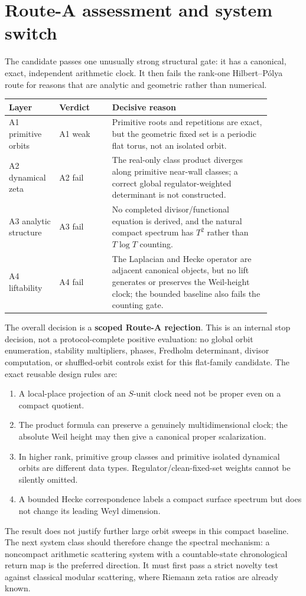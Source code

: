 \section{Route-A assessment and system switch}

The candidate passes one unusually strong structural gate: it has a
canonical, exact, independent arithmetic clock.  It then fails the rank-one
Hilbert--P\'olya route for reasons that are analytic and geometric rather
than numerical.

\begin{center}
\begin{tabular}{p{0.16\linewidth}p{0.18\linewidth}p{0.54\linewidth}}
\toprule
Layer & Verdict & Decisive reason\\
\midrule
A1 primitive orbits & A1 weak & Primitive roots and repetitions are exact,
but the geometric fixed set is a periodic flat torus, not an isolated orbit.\\
A2 dynamical zeta & A2 fail & The real-only class product diverges along
primitive near-wall classes; a correct global regulator-weighted determinant
is not constructed.\\
A3 analytic structure & A3 fail & No completed divisor/functional equation
is derived, and the natural compact spectrum has $T^2$ rather than
$T\log T$ counting.\\
A4 liftability & A4 fail & The Laplacian and Hecke operator are adjacent
canonical objects, but no lift generates or preserves the Weil-height clock;
the bounded baseline also fails the counting gate.\\
\bottomrule
\end{tabular}
\end{center}

The overall decision is a \textbf{scoped Route-A rejection}.  This is an
internal stop decision, not a protocol-complete positive evaluation: no
global orbit enumeration, stability multipliers, phases, Fredholm
determinant, divisor computation, or shuffled-orbit controls exist for this
flat-family candidate.  The exact reusable
design rules are:
\begin{enumerate}
\item A local-place projection of an $S$-unit clock need not be proper even
on a compact quotient.
\item The product formula can preserve a genuinely multidimensional clock;
the absolute Weil height may then give a canonical proper scalarization.
\item In higher rank, primitive group classes and primitive isolated
dynamical orbits are different data types.  Regulator/clean-fixed-set weights
cannot be silently omitted.
\item A bounded Hecke correspondence labels a compact surface spectrum but
does not change its leading Weyl dimension.
\end{enumerate}

The result does not justify further large orbit sweeps in this compact
baseline.  The next system class should therefore change the spectral
mechanism: a noncompact arithmetic scattering system
with a countable-state chronological return map is the preferred direction.
It must first pass a strict novelty test against classical modular scattering,
where Riemann zeta ratios are already known.
